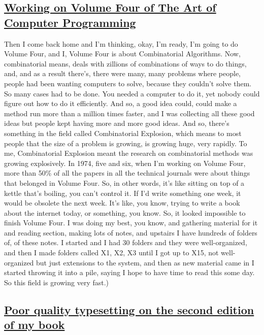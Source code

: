 \documentclass[]{article}
\begin{document}
\subsection{\texorpdfstring{\href{http://webofstories.com/play/17108}{Working
on Volume Four of The Art of Computer
Programming}}{Working on Volume Four of The Art of Computer Programming}}\label{working-on-volume-four-of-the-art-of-computer-programming}

Then I come back home and I'm thinking, okay, I'm ready, I'm going to do
Volume Four, and I, Volume Four is about Combinatorial Algorithms. Now,
combinatorial means, deals with zillions of combinations of ways to do
things, and, and as a result there's, there were many, many problems
where people, people had been wanting computers to solve, because they
couldn't solve them. So many cases had to be done. You needed a computer
to do it, yet nobody could figure out how to do it efficiently. And so,
a good idea could, could make a method run more than a million times
faster, and I was collecting all these good ideas but people kept having
more and more good ideas. And so, there's something in the field called
Combinatorial Explosion, which means to most people that the size of a
problem is growing, is growing huge, very rapidly. To me, Combinatorial
Explosion meant the research on combinatorial methods was growing
explosively. In 1974, five and six, when I'm working on Volume Four,
more than 50\% of all the papers in all the technical journals were
about things that belonged in Volume Four. So, in other words, it's like
sitting on top of a kettle that's boiling, you can't control it. If I'd
write something one week, it would be obsolete the next week. It's like,
you know, trying to write a book about the internet today, or something,
you know. So, it looked impossible to finish Volume Four. I was doing my
best, you know, and gathering material for it and reading section,
making lots of notes, and upstairs I have hundreds of folders of, of
these notes. I started and I had 30 folders and they were
well-organized, and then I made folders called X1, X2, X3 until I got up
to X15, not well-organized but just extensions to the system, and then
as new material came in I started throwing it into a pile, saying I hope
to have time to read this some day. So this field is growing very fast.)

\subsection{\texorpdfstring{\href{http://webofstories.com/play/17109}{Poor
quality typesetting on the second edition of my
book}}{Poor quality typesetting on the second edition of my book}}\label{poor-quality-typesetting-on-the-second-edition-of-my-book}
\end{document}
